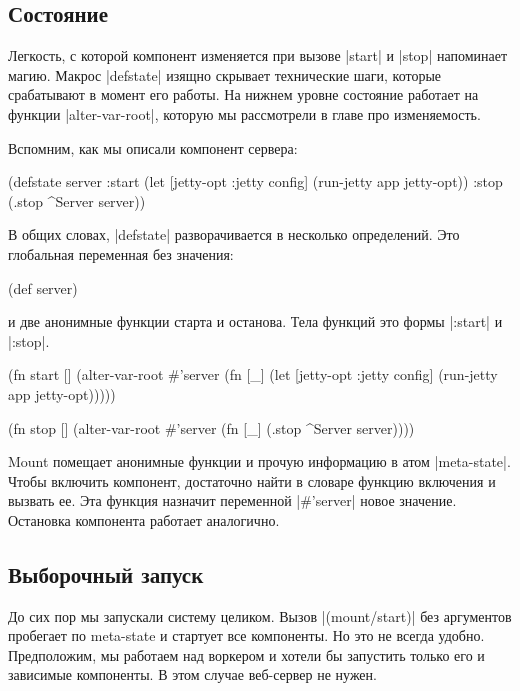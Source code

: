 \subsection{Состояние}

Легкость, с которой компонент изменяется при вызове \spverb|start| и \spverb|stop| напоминает
магию. Макрос \spverb|defstate| изящно скрывает технические шаги, которые срабатывают в
момент его работы. На нижнем уровне состояние работает на функции
\spverb|alter-var-root|, которую мы рассмотрели в главе про изменяемость.

Вспомним, как мы описали компонент сервера:

\begin{code}
(defstate server
  :start (let [{jetty-opt :jetty} config]
           (run-jetty app jetty-opt))
  :stop (.stop ^Server server))
\end{code}

В общих словах, \spverb|defstate| разворачивается в несколько определений. Это
глобальная переменная без значения:

\begin{code}
(def server)
\end{code}

и две анонимные функции старта и останова. Тела функций это формы \spverb|:start| и
\spverb|:stop|.

\begin{code}
(fn start []
  (alter-var-root #'server
   (fn [_]
     (let [{jetty-opt :jetty} config]
       (run-jetty app jetty-opt)))))

(fn stop []
  (alter-var-root #'server
   (fn [_]
     (.stop ^Server server))))
\end{code}

Mount помещает анонимные функции и прочую информацию в атом \spverb|meta-state|. Чтобы
включить компонент, достаточно найти в словаре функцию включения и вызвать
ее. Эта функция назначит переменной \spverb|#'server| новое значение. Остановка
компонента работает аналогично.

\subsection{Выборочный запуск}

До сих пор мы запускали систему целиком. Вызов \spverb|(mount/start)| без аргументов
пробегает по meta-state и стартует все компоненты. Но это не всегда
удобно. Предположим, мы работаем над воркером и хотели бы запустить только его и
зависимые компоненты. В этом случае веб-сервер не нужен.

